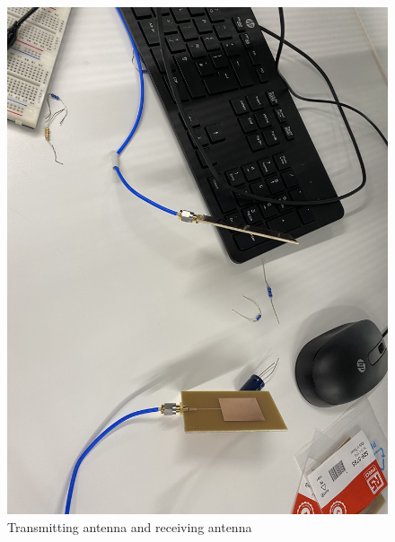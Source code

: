 \documentclass[12pt,a4paper]{report}
\begin{document}
\begin{figure}
    \centerline{\includegraphics[scale=0.1]{Antennas.PNG}}
    \caption{Transmitting antenna and receiving antenna}
    \label{fig:Antennas}
\end{figure}
\end{document}
